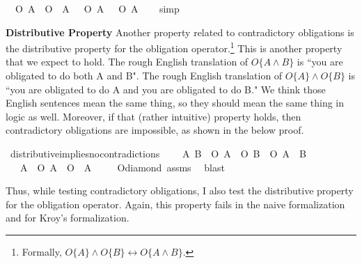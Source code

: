 \begin{isabellebody}
\begin{isamarkuptext}
\medskip%
\end{isamarkuptext}\isamarkuptrue%
\isamarkupfalse%
\ {\isachardoublequoteopen}{\isasymTurnstile}\ {\isacharparenleft}{\isacharparenleft}O\ {\isacharbraceleft}A{\isacharbraceright}\ \isactrlbold {\isasymand}\ O\ {\isacharbraceleft}\isactrlbold {\isasymnot}\ A{\isacharbraceright}{\isacharparenright}\ \isactrlbold {\isasymequiv}\ {\isacharparenleft}\isactrlbold {\isasymnot}\ {\isacharparenleft}O\ {\isacharbraceleft}A{\isacharbraceright}\ \isactrlbold {\isasymrightarrow}\ \isactrlbold {\isasymnot}\ O\ {\isacharbraceleft}\isactrlbold {\isasymnot}A{\isacharbraceright}{\isacharparenright}{\isacharparenright}{\isacharparenright}{\isachardoublequoteclose}\isanewline
%
\isadelimproof
\ \ %
\endisadelimproof
%
\isatagproof
{}\isamarkupfalse%
\ simp%
\endisatagproof
{\isafoldproof}%
%
\isadelimproof
%
\endisadelimproof
%
\begin{isamarkuptext}%
\textbf{Distributive Property} Another property related to contradictory obligations is the distributive property for the obligation
operator.\footnote{Formally, $O\{A\} \wedge O\{B\} \longleftrightarrow O\{A \wedge B\}$.} This is 
another property that we expect to hold. The rough English translation of  $O \{ A \wedge B \} $ is ``you are obligated to 
do both A and B". The rough English translation of $O\{A\} \wedge O\{B\}$ is ``you are obligated to do A 
and you are obligated to do B." We think those English sentences mean the same thing, so they should mean 
the same thing in logic as well. Moreover, if that (rather intuitive) property holds, then contradictory
obligations are impossible, as shown in the below proof.%
\end{isamarkuptext}\isamarkuptrue%
\isamarkupfalse%
\ distributive{\isacharunderscore}implies{\isacharunderscore}no{\isacharunderscore}contradictions{\isacharcolon}\ \isanewline
\ \ \ {\isachardoublequoteopen}{\isasymforall}A\ B{\isachardot}\ {\isasymTurnstile}\ {\isacharparenleft}{\isacharparenleft}O\ {\isacharbraceleft}A{\isacharbraceright}\ \isactrlbold {\isasymand}\ O\ {\isacharbraceleft}B{\isacharbraceright}{\isacharparenright}\ \isactrlbold {\isasymequiv}\ O\ {\isacharbraceleft}A\ \isactrlbold {\isasymand}\ B{\isacharbraceright}{\isacharparenright}{\isachardoublequoteclose}\isanewline
\ \ \ {\isachardoublequoteopen}{\isasymforall}A{\isachardot}\ {\isasymTurnstile}{\isacharparenleft}\ \isactrlbold {\isasymnot}{\isacharparenleft}O\ {\isacharbraceleft}A{\isacharbraceright}\ \isactrlbold {\isasymand}\ O\ {\isacharbraceleft}\isactrlbold {\isasymnot}\ A{\isacharbraceright}{\isacharparenright}{\isacharparenright}\ {\isachardoublequoteclose}\isanewline
%
\isadelimproof
\ \ %
\endisadelimproof
%
\isatagproof
{}\isamarkupfalse%
\ O{\isacharunderscore}diamond\ assms\ \isamarkupfalse%
\ blast%
\endisatagproof
{\isafoldproof}%
%
\isadelimproof
%
\endisadelimproof
%
\begin{isamarkuptext}%
Thus, while testing contradictory obligations, I also test the distributive property for the 
obligation operator. Again, this property fails in the naive formalization and for Kroy's formalization.



\end{isamarkuptext}
\end{isabellebody}
